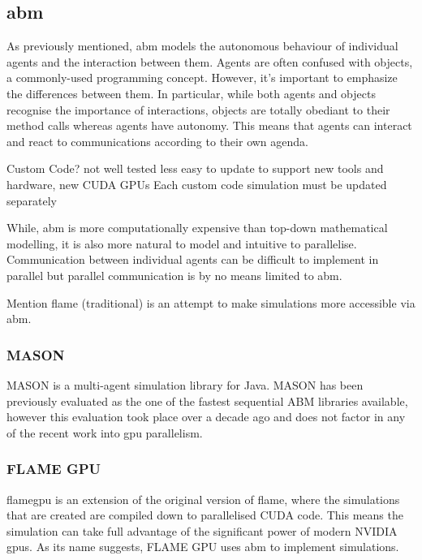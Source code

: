 \documentclass{UoYCSproject}
\begin{document}
\subsection{\acrlong{abm}}
\label{abm}
As previously mentioned, \gls{abm} models the autonomous behaviour of individual agents and the interaction between them.
Agents are often confused with objects, a commonly-used programming concept.
However, it's important to emphasize the differences between them.
In particular, while both agents and objects recognise the importance of interactions, objects are totally obediant to their method calls whereas agents have autonomy.
This means that agents can interact and react to communications according to their own agenda.

Custom Code?\cite{phil_diss}
    not well tested
    less easy to update to support new tools and hardware, new CUDA GPUs
        Each custom code simulation must be updated separately

While, \acrlong{abm} is more computationally expensive than top-down mathematical modelling, it is also more natural to model and intuitive to parallelise\cite{flame_simulation}.
Communication between individual agents can be difficult to implement in parallel but parallel communication is by no means limited to \gls{abm}.


Mention \acrshort{flame} (traditional) is an attempt to make simulations more accessible via \acrshort{abm}.


\subsubsection{\gls{MASON}}
\gls{MASON} is a multi-agent simulation library for Java.
\gls{MASON} has been previously evaluated as the one of the fastest sequential ABM libraries available\cite{abm_platforms_review}, however this evaluation took place over a decade ago and does not factor in any of the recent work into \acrshort{gpu} parallelism.

\subsubsection{\gls{FLAME GPU}}
\acrfull{flamegpu} is an extension of the original version of \acrshort{flame}, where the simulations that are created are compiled down to parallelised CUDA code. This means the simulation can take full advantage of the significant power of modern NVIDIA \acrshort{gpu}s.
As its name suggests, \gls{FLAME GPU} uses \acrlong{abm} to implement simulations.
\end{document}
